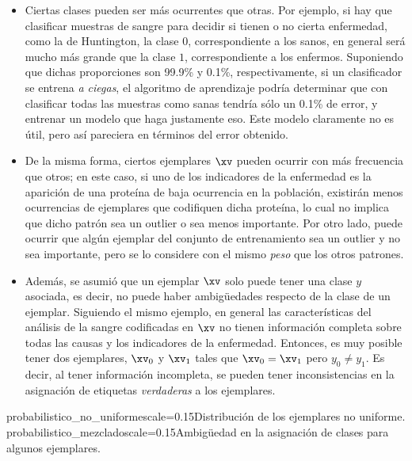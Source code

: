 \newcommand{\XV}{\mathbf{X}}	
\newcommand{\DP}{P}	
\begin{itemize}

\item Ciertas clases pueden ser más ocurrentes que otras. Por ejemplo, si hay que clasificar muestras de sangre para decidir si tienen o no cierta enfermedad, como la de Huntington, la clase $0$, correspondiente a los sanos, en general será mucho más grande que la clase $1$, correspondiente a los enfermos. Suponiendo que dichas proporciones son 99.9\% y 0.1\%, respectivamente, si un clasificador se entrena \textit{a ciegas}, el algoritmo de aprendizaje podría determinar que con clasificar todas las muestras como sanas tendría sólo un 0.1\% de error, y entrenar un modelo que haga justamente eso. Este modelo claramente no es útil, pero así pareciera en términos del error obtenido. 

\item De la misma forma, ciertos ejemplares $\xv$ pueden ocurrir con más frecuencia que otros; en este caso, si uno de los indicadores de la enfermedad es la aparición de una proteína de baja ocurrencia en la población, existirán menos ocurrencias de ejemplares que codifiquen dicha proteína, lo cual no implica que dicho patrón sea un outlier o sea menos importante. Por otro lado, puede ocurrir que algún ejemplar del conjunto de entrenamiento sea un outlier y no sea importante, pero se lo considere con el mismo \textit{peso} que los otros patrones.
 
\item Además, se asumió que un ejemplar $\xv$ solo puede tener una clase $y$ asociada, es decir, no puede haber ambigüedades respecto de la clase de un ejemplar.  Siguiendo el mismo ejemplo, en general las características del análisis de la sangre codificadas en $\xv$ no tienen información completa sobre todas las causas y los indicadores de la enfermedad. Entonces, es muy posible tener dos ejemplares, $\xv_0$ y $\xv_1$ tales que $\xv_0=\xv_1$ pero $y_0 \neq y_1$. Es decir, al tener información incompleta, se pueden tener inconsistencias en la asignación de etiquetas \textit{verdaderas} a los ejemplares.

\end{itemize}

{probabilistico_no_uniforme}{scale=0.15}{Distribución de los ejemplares no uniforme.}
{probabilistico_mezclado}{scale=0.15}{Ambigüedad en la asignación de clases para algunos ejemplares.}


